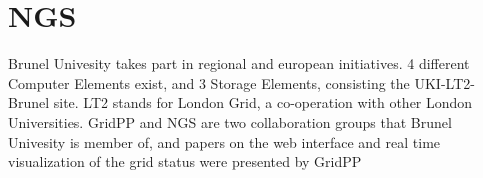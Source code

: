 \section{NGS}
Brunel Univesity takes part in regional and european initiatives. 4 different
Computer Elements exist, and 3 Storage Elements, consisting the UKI-LT2-Brunel
site. LT2 stands for London Grid, a co-operation with other London Universities.
GridPP and NGS are two collaboration groups that Brunel Univesity is member of,
and papers on the web interface \cite{Hobson2007} and real time visualization of
the grid status were presented \cite{Huang2007} by GridPP

